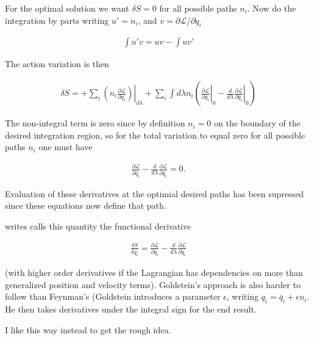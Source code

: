 \documentclass{article}
\newcommand{\LL}[0]{\mathcal{L}}
\newcommand{\qdot}[0]{\dot{q}}
\newcommand{\ndot}[0]{\dot{n}}
\newcommand{\qbar}[0]{\bar{q}}
\newcommand{\PD}[2]{\frac{\partial {#2}}{\partial {#1}}}
\begin{document}
For the optimal solution we want $\delta S = 0$ for all possible paths $n_i$.  Now do the integration by parts writing
$u' = \ndot_i$, and $v = \partial \LL/{\partial \qdot_i}$ 

\begin{align*}
\int u' v = u v - \int u v'
\end{align*}

The action variation is then

\begin{align*}
\delta S =
+ \sum_i \left. \left( n_i \PD{\qdot_i}{\LL} \right) \right\vert_{\partial \lambda}
+ \sum_i \int d\lambda n_i
\left(
\left. \PD{q_i}{\LL} \right\vert_0
-\frac{d}{d\lambda} \left. \PD{\qdot_i}{\LL} \right\vert_0
\right)
\end{align*}

The non-integral term is zero since by definition $n_i = 0$ on the boundary of the desired integration region, so for the
total variation to equal zero for all possible paths $n_i$ one must have

\begin{align*}
\PD{q_i}{\LL} -\frac{d}{d\lambda} \PD{\qdot_i}{\LL} = 0.
\end{align*}

Evaluation of these derivatives at the optimial desired paths has been supressed since these equations now define that path.

\cite{goldstein1951cm} writes calls this quantity the functional derivative

\begin{align*}
\frac{\delta S}{\delta q_i} = \PD{q_i}{\LL} -\frac{d}{d\lambda} \PD{\qdot_i}{\LL}
\end{align*}

(with higher order derivatives if the Lagrangian has dependencies on more than generalized position and velocity terms).  Goldstein's 
approach is also harder to follow than Feynman's (Goldstein introduces a parameter $\epsilon$, writing $q_i = \qbar_i + \epsilon n_i$.  He then takes derivatives under the integral sign for the end result.

I like this way instead to get the rough idea.


\end{document}
